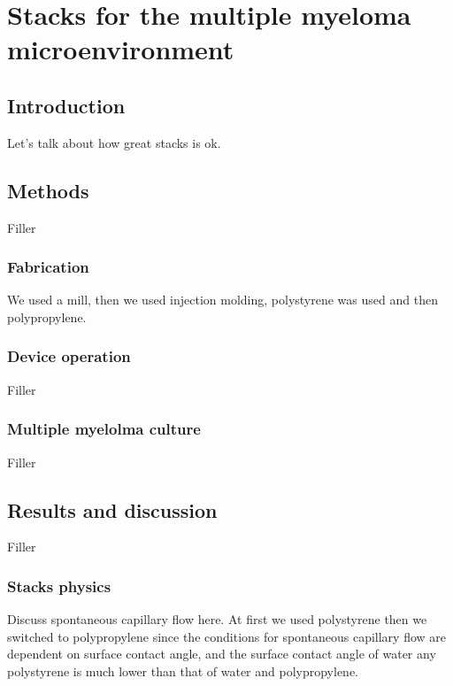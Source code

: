 \chapter{Stacks for the multiple myeloma microenvironment}
\label{Chap:Stacks}

\section{Introduction}
Let's talk about how great stacks is ok.
\section{Methods}
Filler

\subsection{Fabrication}
We used a mill, then we used injection molding, polystyrene was used and then polypropylene.

\subsection{Device operation}
Filler

\subsection{Multiple myelolma culture}
Filler

\section{Results and discussion}
Filler 

\subsection{Stacks physics}

Discuss spontaneous capillary flow here. At first we used polystyrene then we switched to polypropylene since the conditions for spontaneous capillary flow are dependent on surface contact angle, and the surface contact angle of water any polystyrene is much lower than that of water and polypropylene.

